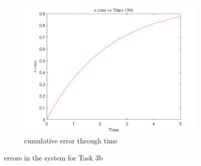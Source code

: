 \documentclass[a4paper,12pt]{article}
\begin{document}
\begin{figure}[h]
  \vspace{0.5cm}

  \begin{subfigure}[b]{0.5\textwidth}
      \includegraphics[width=\textwidth]{../../Matlab/task3b_plots/e_cum_vs_time.png}
      \caption{cumulative error through time}
      \label{fig:image12}
  \end{subfigure}
  \hfill
  
  \caption{errors in the system for Task 3b}
  \label{fig:error_task3b}
\end{figure}



\end{document}
